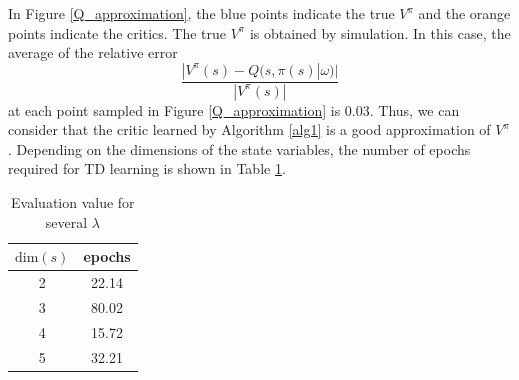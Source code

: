 \documentclass[english, dvipdfmx]{ampmt}             %
\begin{document}
In Figure \ref{Q_approximation}, the blue points indicate the true $V^{\pi}$ and the orange points indicate the critics. The true $V^{\pi}$ is obtained by simulation. 
In this case, the average of the relative error
\begin{equation}
	\frac{|V^{\pi}(s)-Q(s, \pi(s)|\omega)|}{|V^{\pi}(s)|}
\end{equation}
at each point sampled in Figure \ref{Q_approximation} is 0.03. Thus, we can consider that the critic learned by Algorithm \ref{alg1} is a good approximation of $V^{\pi}$. Depending on the dimensions of the state variables, the number of epochs required for TD learning is shown in Table \ref{epoch}. 
\begin{table}[htb]
  \begin{center}
    \begin{tabular}{|cc|} \hline
      $\textrm{dim}(s)$ & epochs \\ \hline 
      2 & 22.14 \\
      3 & 80.02 \\
      4 & 15.72 \\
      5 & 32.21 \\ \hline
    \end{tabular}
    \caption{Evaluation value for several $\lambda$}
    \label{epoch}
  \end{center}
\end{table}
\end{document}
